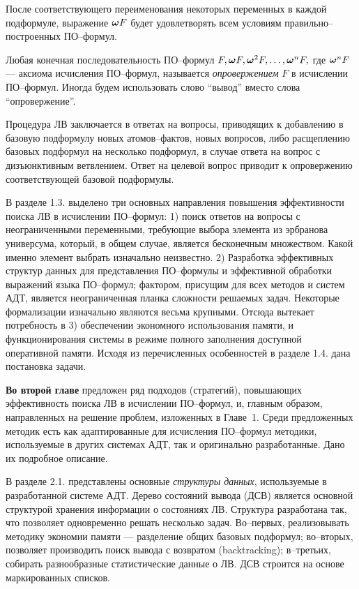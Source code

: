\documentclass[a4paper]{report}
\begin{document}
После соответствующего переименования некоторых переменных в каждой подформуле, выражение $\boldsymbol{\omega} F$ будет удовлетворять всем условиям пра\-виль\-но--пос\-тро\-ен\-ных ПО--формул.

Любая конечная последовательность ПО--формул $F, \boldsymbol{\omega} F, \boldsymbol{\omega}^2 F,\ldots,\boldsymbol{\omega}^n F,$ где $\boldsymbol{\omega}^n F$ --- аксиома исчисления ПО--формул, называется {\em опровержением} $F$ в исчислении ПО--формул. Иногда будем использовать слово ``вывод'' вместо слова ``опровержение''.

Процедура ЛВ заключается в ответах на вопросы, приводящих к добавлению в базовую подформулу новых атомов--фактов, новых вопросов, либо расщеплению базовых подформул на несколько подформул, в случае ответа на вопрос с дизъюнктивным ветвлением. Ответ на целевой вопрос приводит к опровержению соответствующей базовой подформулы.


В разделе 1.3. выделено три основных направления повышения эффективности поиска ЛВ в исчислении ПО--формул: 1) поиск ответов на вопросы с неограниченными переменными, требующие выбора элемента из эрбранова универсума, который, в общем случае, является бесконечным множеством. Какой именно элемент выбрать изначально неизвестно. 2) Разработка эффективных структур данных для представления ПО--формулы и эффективной обработки выражений языка ПО--формул; фактором, присущим для всех методов и систем АДТ, является неограниченная планка сложности решаемых задач. Некоторые формализации изначально являются весьма крупными. Отсюда вытекает потребность в 3) обеспечении экономного использования памяти, и функционирования системы в режиме полного заполнения доступной оперативной памяти. Исходя из перечисленных особенностей в разделе 1.4. дана постановка задачи.

\textbf{Во второй главе} предложен ряд подходов (стратегий), повышающих эффективность поиска ЛВ в исчислении ПО--формул, и, главным образом, направленных на решение проблем, изложенных в Главе~1. Среди предложенных методик есть как адаптированные для исчисления ПО--формул методики, используемые в других системах АДТ, так и оригинально разработанные. Дано их подробное описание.

В разделе 2.1. представлены основные \emph{структуры данных}, используемые в разработанной системе АДТ. Дерево состояний вывода (ДСВ) является основной структурой хранения информации о состояниях ЛВ. Структура разработана так, что позволяет одновременно решать несколько задач. Во--первых, реализовывать методику экономии памяти --- разделение общих базовых подформул; во--вторых, позволяет производить поиск вывода с возвратом (backtracking); в--третьих, собирать разнообразные статистические данные о ЛВ. ДСВ строится на основе маркированных списков.
\end{document}
